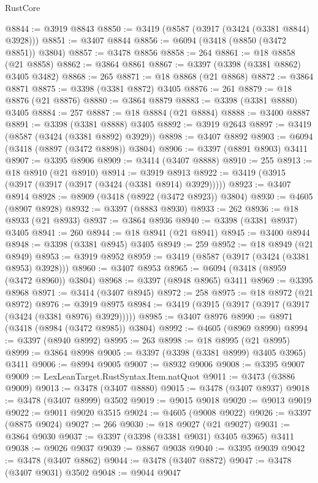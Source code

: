 \begin{lexlean}{RustCore}
\begin{coremodule}
@8844 := @3919 @8843
@8850 := @3419 (@8587 (@3917 (@3424 (@3381 @8844) @3928)))
@8851 := @3407 @8844
@8856 := @6094 (@3418 (@8850 (@3472 @8851)) @3804)
@8857 := @3478 @8856
@8858 := 264
@8861 := @18 @8858 (@21 @8858)
@8862 := @3864 @8861
@8867 := @3397 (@3398 (@3381 @8862) @3405 @3482)
@8868 := 265
@8871 := @18 @8868 (@21 @8868)
@8872 := @3864 @8871
@8875 := @3398 (@3381 @8872) @3405
@8876 := 261
@8879 := @18 @8876 (@21 @8876)
@8880 := @3864 @8879
@8883 := @3398 (@3381 @8880) @3405
@8884 := 257
@8887 := @18 @8884 (@21 @8884)
@8888 := @3400 @8887
@8891 := @3398 (@3381 @8888) @3405
@8892 := @3919 @2643
@8897 := @3419 (@8587 (@3424 (@3381 @8892) @3929))
@8898 := @3407 @8892
@8903 := @6094 (@3418 (@8897 (@3472 @8898)) @3804)
@8906 := @3397 (@8891 @8903) @3411
@8907 := @3395 @8906
@8909 := @3414 (@3407 @8888)
@8910 := 255
@8913 := @18 @8910 (@21 @8910)
@8914 := @3919 @8913
@8922 := @3419 (@3915 (@3917 (@3917 (@3917 (@3424 (@3381 @8914) @3929)))))
@8923 := @3407 @8914
@8928 := @8909 (@3418 (@8922 (@3472 @8923)) @3804)
@8930 := @4605 (@8907 @8928)
@8932 := @3397 (@8883 @8930)
@8933 := 262
@8936 := @18 @8933 (@21 @8933)
@8937 := @3864 @8936
@8940 := @3398 (@3381 @8937) @3405
@8941 := 260
@8944 := @18 @8941 (@21 @8941)
@8945 := @3400 @8944
@8948 := @3398 (@3381 @8945) @3405
@8949 := 259
@8952 := @18 @8949 (@21 @8949)
@8953 := @3919 @8952
@8959 := @3419 (@8587 (@3917 (@3424 (@3381 @8953) @3928)))
@8960 := @3407 @8953
@8965 := @6094 (@3418 (@8959 (@3472 @8960)) @3804)
@8968 := @3397 (@8948 @8965) @3411
@8969 := @3395 @8968
@8971 := @3414 (@3407 @8945)
@8972 := 258
@8975 := @18 @8972 (@21 @8972)
@8976 := @3919 @8975
@8984 := @3419 (@3915 (@3917 (@3917 (@3917 (@3424 (@3381 @8976) @3929)))))
@8985 := @3407 @8976
@8990 := @8971 (@3418 (@8984 (@3472 @8985)) @3804)
@8992 := @4605 (@8969 @8990)
@8994 := @3397 (@8940 @8992)
@8995 := 263
@8998 := @18 @8995 (@21 @8995)
@8999 := @3864 @8998
@9005 := @3397 (@3398 (@3381 @8999) @3405 @3965) @3411
@9006 := @8994 @9005
@9007 := @8932 @9006
@9008 := @3395 @9007
@9009 := LexLeanTarget.RustSyntax.Item.natQuot
@9011 := @3473 (@3886 @9009)
@9013 := @3478 (@3407 @8880)
@9015 := @3478 (@3407 @8937)
@9018 := @3478 (@3407 @8999) @3502
@9019 := @9015 @9018
@9020 := @9013 @9019
@9022 := @9011 @9020 @3515
@9024 := @4605 (@9008 @9022)
@9026 := @3397 (@8875 @9024)
@9027 := 266
@9030 := @18 @9027 (@21 @9027)
@9031 := @3864 @9030
@9037 := @3397 (@3398 (@3381 @9031) @3405 @3965) @3411
@9038 := @9026 @9037
@9039 := @8867 @9038
@9040 := @3395 @9039
@9042 := @3478 (@3407 @8862)
@9044 := @3478 (@3407 @8872)
@9047 := @3478 (@3407 @9031) @3502
@9048 := @9044 @9047

\end{coremodule}
\end{lexlean}
